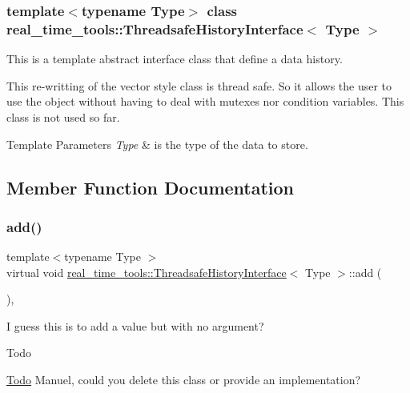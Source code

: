 \subsubsection*{template$<$typename Type$>$\newline
class real\+\_\+time\+\_\+tools\+::\+Threadsafe\+History\+Interface$<$ Type $>$}

This is a template abstract interface class that define a data history. 

This re-\/writting of the vector style class is thread safe. So it allows the user to use the object without having to deal with mutexes nor condition variables. This class is not used so far.


\begin{DoxyTemplParams}{Template Parameters}
{\em Type} & is the type of the data to store. \\
\hline
\end{DoxyTemplParams}


\subsection{Member Function Documentation}
\mbox{\label{classreal__time__tools_1_1ThreadsafeHistoryInterface_a3304dfddbf562b835745be3ff363ab17}} 
\subsubsection{\texorpdfstring{add()}{add()}}
{\footnotesize\ttfamily template$<$typename Type $>$ \\
virtual void \hyperlink{classreal__time__tools_1_1ThreadsafeHistoryInterface}{real\+\_\+time\+\_\+tools\+::\+Threadsafe\+History\+Interface}$<$ Type $>$\+::add (\begin{DoxyParamCaption}{ }\end{DoxyParamCaption})\hspace{0.3cm}{\ttfamily [private]}, {}}



I guess this is to add a value but with no argument? 

\begin{DoxyRefDesc}{Todo}
\item[\hyperlink{todo__todo000002}{Todo}]Manuel, could you delete this class or provide an implementation? \end{DoxyRefDesc}
\mbox{\label{classreal__time__tools_1_1ThreadsafeHistoryInterface_a34424c202bd02b70bb2178f506a67602}} 
